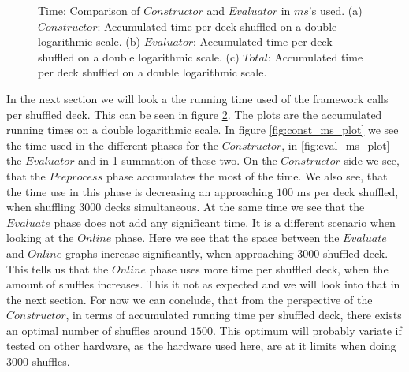 \documentclass[twoside,11pt,openright]{report}
\begin{document}
\begin{figure}
    \begin{subfigure}{\textwidth}
        \centering
        \caption{}
        \label{fig:total_ms_plot}
    \end{subfigure}

    \caption{Time: Comparison of $Constructor$ and $Evaluator$ in $ms$'s used. (a) $Constructor$: Accumulated time per deck shuffled on a double logarithmic scale. (b) $Evaluator$: Accumulated time per deck shuffled on a double logarithmic scale. (c) $Total$: Accumulated time per deck shuffled on a double logarithmic scale.}
    \label{fig:mesurement_ms}
\end{figure}

In the next section we will look a the running time used of the framework calls per shuffled deck. This can be seen in figure \ref{fig:mesurement_ms}. The plots are the accumulated running times on a double logarithmic scale. In figure \ref{fig:const_ms_plot} we see the time used in the different phases for the $Constructor$, in \ref{fig:eval_ms_plot} the $Evaluator$ and in \ref{fig:total_ms_plot} summation of these two. On the $Constructor$ side we see, that the $Preprocess$ phase accumulates the most of the time. We also see, that the time use in this phase is decreasing an approaching $100$ ms per deck shuffled, when shuffling $3000$ decks simultaneous. At the same time we see that the $Evaluate$ phase does not add any significant time. It is a different scenario when looking at the $Online$ phase. Here we see that the space between the $Evaluate$ and $Online$ graphs increase significantly, when approaching $3000$ shuffled deck. This tells us that the $Online$ phase uses more time per shuffled deck, when the amount of shuffles increases. This it not as expected and we will look into that in the next section. For now we can conclude, that from the perspective of the $Constructor$, in terms of accumulated running time per shuffled deck, there exists an optimal number of shuffles around $1500$. This optimum will probably variate if tested on other hardware, as the hardware used here, are at it limits when doing $3000$ shuffles.
\end{document}
